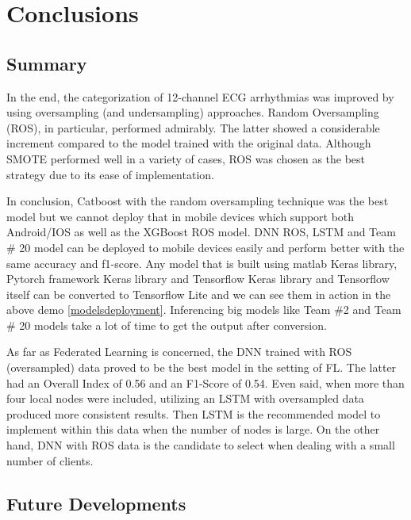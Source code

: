 \chapter{Conclusions} \label{chap6}

\section{Summary} \label{6summary}

In the end, the categorization of 12-channel ECG arrhythmias was improved by using oversampling (and undersampling) approaches. Random Oversampling (ROS), in particular, performed admirably. The latter showed a considerable increment compared to the model trained with the original data. Although SMOTE performed well in a variety of cases, ROS was chosen as the best strategy due to its ease of implementation.

In conclusion, Catboost with the random oversampling technique was the best model but we cannot deploy that in mobile devices which support both Android/IOS as well as the XGBoost ROS model. DNN ROS, LSTM and Team \# 20 model can be deployed to mobile devices easily and perform better with the same accuracy and f1-score. Any model that is built using matlab Keras library, Pytorch framework Keras library and Tensorflow Keras library and Tensorflow itself can be converted to Tensorflow Lite and we can see them in action in the above demo \ref{modelsdeployment}. Inferencing big models like Team \#2 and Team \# 20 models take a lot of time to get the output after conversion. 

As far as Federated Learning is concerned, the DNN trained with ROS (oversampled) data proved to be the best model in the setting of FL. The latter had an Overall Index of 0.56 and an F1-Score of 0.54. Even said, when more than four local nodes were included, utilizing an LSTM with oversampled data produced more consistent results. Then LSTM is the recommended model to implement within this data when the number of nodes is large. On the other hand, DNN with ROS data is the candidate to select when dealing with a small number of clients.



\section{Future Developments} \label{6futuredevelopments}

